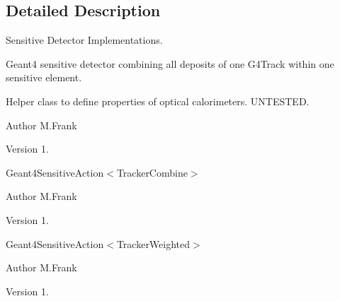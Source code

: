 \subsection{Detailed Description}
Sensitive Detector Implementations. 

Geant4 sensitive detector combining all deposits of one G4\+Track within one sensitive element.

Helper class to define properties of optical calorimeters. U\+N\+T\+E\+S\+T\+ED.

\begin{DoxyAuthor}{Author}
M.\+Frank 
\end{DoxyAuthor}
\begin{DoxyVersion}{Version}
1.
\end{DoxyVersion}
Geant4\+Sensitive\+Action$<$\+Tracker\+Combine$>$

\begin{DoxyAuthor}{Author}
M.\+Frank 
\end{DoxyAuthor}
\begin{DoxyVersion}{Version}
1.
\end{DoxyVersion}
Geant4\+Sensitive\+Action$<$\+Tracker\+Weighted$>$

\begin{DoxyAuthor}{Author}
M.\+Frank 
\end{DoxyAuthor}
\begin{DoxyVersion}{Version}
1. 
\end{DoxyVersion}
